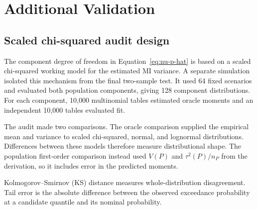 \chapter{Additional Validation}
\label{app:additional-validation}

\section{Scaled chi-squared audit design}

The component degree of freedom in Equation~\eqref{eq:nu-p-hat} is based on a
scaled chi-squared working model for the estimated MI variance. A separate
simulation isolated this mechanism from the final two-sample test. It used 64
fixed scenarios and evaluated both population components, giving 128
component distributions. For each component, 10,000 multinomial tables
estimated oracle moments and an independent 10,000 tables evaluated fit.

The audit made two comparisons. The oracle comparison supplied the empirical
mean and variance to scaled chi-squared, normal, and lognormal distributions.
Differences between these models therefore measure distributional shape. The
population first-order comparison instead used $V(P)$ and
$\tau^2(P)/n_P$ from the derivation, so it includes error in the predicted
moments.

Kolmogorov--Smirnov (KS) distance measures whole-distribution disagreement.
Tail error is the absolute difference between the observed exceedance
probability at a candidate quantile and its nominal probability.

\begin{table}[htbp]
\centering
\caption{Overall distributional audit for the MI variance estimator.}
\label{tab:appendix-scaled-chi-overall}
\small
{}
\end{table}

